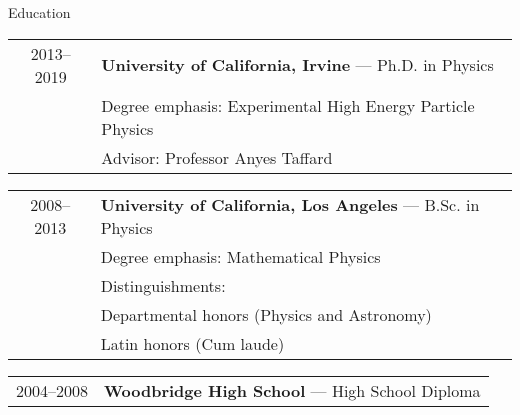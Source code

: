 \vspace{0.35in}
{\Large Education}\\
\HRule
\vspace{0.25in}

\hspace{0.18in}
\begin{tabular}{c|l}
     2013--2019 & {\bf{University of California, Irvine}} --- Ph.D. in Physics \\
			  & \hspace{0.5cm}Degree emphasis: Experimental High Energy Particle Physics \\
              & \hspace{0.5cm}Advisor: Professor Anyes Taffard
\end{tabular}

\vspace{0.1in}
\hspace{0.18in}
\begin{tabular}{c|l}
    2008--2013 & {\bf{University of California, Los Angeles}} --- B.Sc. in Physics \\
              & \hspace{0.5cm}Degree emphasis: Mathematical Physics \\
			  & \hspace{0.5cm}Distinguishments:\\
              & \hspace{0.8cm}Departmental honors (Physics and Astronomy) \\
              & \hspace{0.8cm}Latin honors (Cum laude) \\
\end{tabular}
\vspace{0.11in}

\hspace{0.18in}
\begin{tabular}{c|l}
    2004--2008 & {\bf{Woodbridge High School}} --- High School Diploma \\
\end{tabular}

